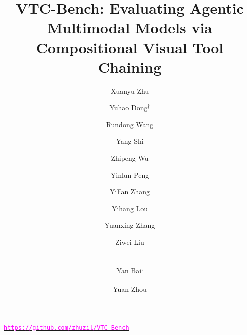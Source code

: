 \documentclass[runningheads]{llncs}
\newcommand{\benchname}{VTC-Bench\xspace}
\begin{document}
\title{\benchname: Evaluating Agentic Multimodal Models via Compositional Visual Tool Chaining} 


\author{Xuanyu Zhu \and
Yuhao Dong$^\dagger$ \and
Rundong Wang \and Yang Shi \and Zhipeng Wu \and Yinlun Peng \and YiFan Zhang \and Yihang Lou \and Yuanxing Zhang \and Ziwei Liu \and \\ Yan Bai\textsuperscript{,\Letter} \and Yuan Zhou\textsuperscript{\Letter}}




\maketitle


\renewcommand{\thefootnote}{$\dagger$} %

\renewcommand{\thefootnote}{\Letter}   %

\renewcommand{\thefootnote}{\arabic{footnote}} %
\begin{center}
    \large %
    \href{https://github.com/zhuzil/VTC-Bench}{\textcolor{magenta}{\texttt{https://github.com/zhuzil/VTC-Bench}}}
\end{center}
\end{document}
